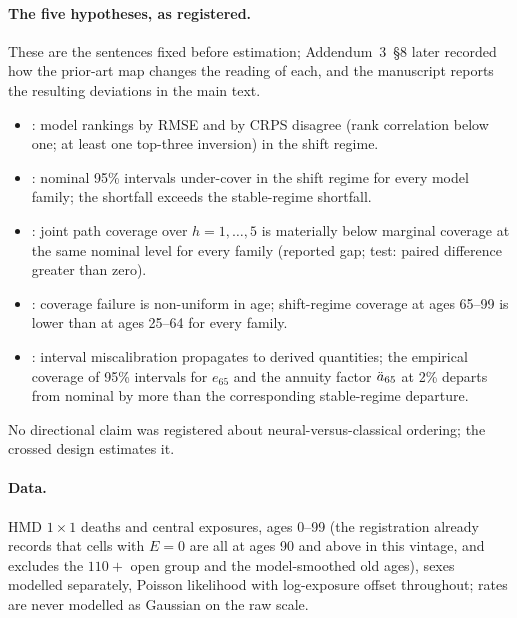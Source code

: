 \paragraph{The five hypotheses, as registered.} These are the sentences fixed
before estimation; Addendum~3~\S8 later recorded how the prior-art map
changes the reading of each, and the manuscript reports the resulting
deviations in the main text.

\begin{itemize}
\item \Hone: model rankings by RMSE and by CRPS disagree (rank correlation
  below one; at least one top-three inversion) in the shift regime.
\item \Htwo: nominal 95\% intervals under-cover in the shift regime for every
  model family; the shortfall exceeds the stable-regime shortfall.
\item \Hthree: joint path coverage over $h=1,\dots,5$ is materially below
  marginal coverage at the same nominal level for every family (reported gap;
  test: paired difference greater than zero).
\item \Hfour: coverage failure is non-uniform in age; shift-regime coverage at
  ages 65--99 is lower than at ages 25--64 for every family.
\item \Hfive: interval miscalibration propagates to derived quantities; the
  empirical coverage of 95\% intervals for $e_{65}$ and the annuity factor
  $\ddot{a}_{65}$ at 2\% departs from nominal by more than the corresponding
  stable-regime departure.
\end{itemize}

No directional claim was registered about neural-versus-classical ordering;
the crossed design estimates it.

\paragraph{Data.} HMD $1\times1$ deaths and central exposures, ages 0--99
(the registration already records that cells with $E=0$ are all at ages 90 and
above in this vintage, and excludes the $110{+}$ open group and the
model-smoothed old ages), sexes modelled separately, Poisson likelihood with
log-exposure offset throughout; rates are never modelled as Gaussian on the
raw scale.

